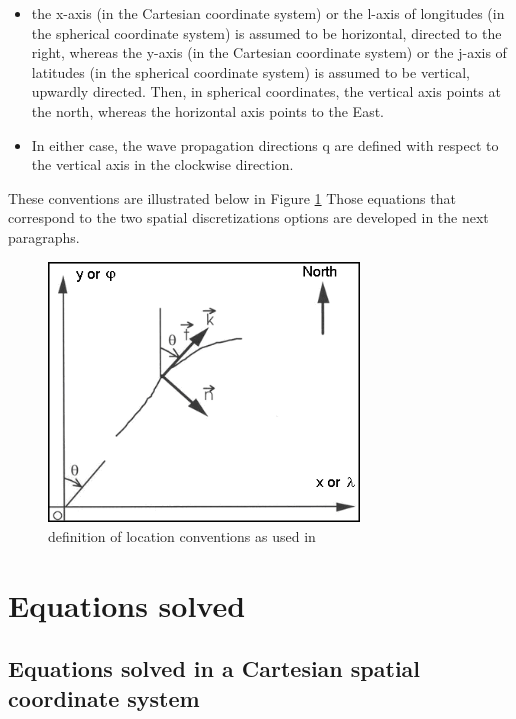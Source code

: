  \begin{itemize}
\item the x-axis (in the Cartesian coordinate system) or the l-axis of longitudes (in the spherical coordinate system) is assumed to be horizontal, directed to the right, whereas the y-axis (in the Cartesian coordinate system) or the j-axis of latitudes (in the spherical coordinate system) is assumed to be vertical, upwardly directed. Then, in spherical coordinates, the vertical axis points at the north, whereas the horizontal axis points to the East.

 \item In either case, the wave propagation directions q are defined with respect to the vertical axis in the clockwise direction.
\end{itemize}

 These conventions are illustrated below in Figure \ref{fig:defloc} Those equations that correspond to the two spatial discretizations options are developed in the next paragraphs.

\begin{figure}[H]%
\begin{center}
\includegraphics*[width=3.25in,  keepaspectratio=true]{graphics/defloc}
\caption{definition of location conventions as used in \tomawac}
\label{fig:defloc}
\end{center}
\end{figure}


\section{  Equations solved}


\subsection{ Equations solved in a Cartesian spatial coordinate system}

